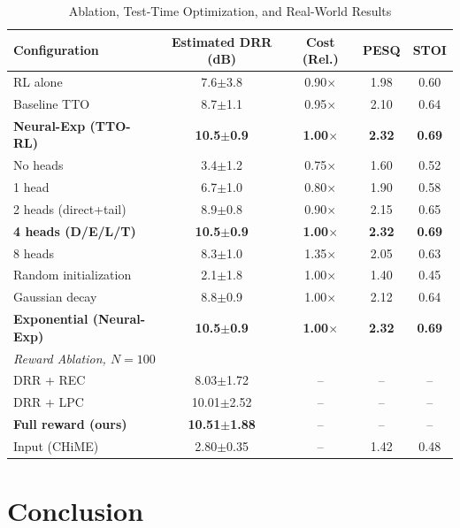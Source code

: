 \documentclass[10pt,conference]{IEEEtran}
\begin{document}
\begin{table}[H]
\centering
\caption{Ablation, Test-Time Optimization, and Real-World Results}
\label{tab:combined}
\scriptsize
\begin{tabular}{@{}lcccc@{}}
\toprule
\textbf{Configuration} & \textbf{Estimated DRR (dB)} & \textbf{Cost (Rel.)} & \textbf{PESQ} & \textbf{STOI} \\
\midrule
RL alone & 7.6$\pm$3.8 & 0.90$\times$ & 1.98 & 0.60 \\
Baseline TTO & 8.7$\pm$1.1 & 0.95$\times$ & 2.10 & 0.64 \\
\textbf{Neural-Exp (TTO-RL)} & \textbf{10.5$\pm$0.9} & \textbf{1.00$\times$} & \textbf{2.32} & \textbf{0.69} \\
\midrule
No heads & 3.4$\pm$1.2 & 0.75$\times$ & 1.60 & 0.52 \\
1 head & 6.7$\pm$1.0 & 0.80$\times$ & 1.90 & 0.58 \\
2 heads (direct+tail) & 8.9$\pm$0.8 & 0.90$\times$ & 2.15 & 0.65 \\
\textbf{4 heads (D/E/L/T)} & \textbf{10.5$\pm$0.9} & \textbf{1.00$\times$} & \textbf{2.32} & \textbf{0.69} \\
8 heads & 8.3$\pm$1.0 & 1.35$\times$ & 2.05 & 0.63 \\
\midrule
Random initialization & 2.1$\pm$1.8 & 1.00$\times$ & 1.40 & 0.45 \\
Gaussian decay & 8.8$\pm$0.9 & 1.00$\times$ & 2.12 & 0.64 \\
\textbf{Exponential (Neural-Exp)} & \textbf{10.5$\pm$0.9} & \textbf{1.00$\times$} & \textbf{2.32} & \textbf{0.69} \\
\midrule
\multicolumn{5}{l}{\textit{Reward Ablation, $N=100$}} \\
\midrule
DRR + REC & 8.03$\pm$1.72 & -- & -- & -- \\
DRR + LPC & 10.01$\pm$2.52 & -- & -- & -- \\
\textbf{Full reward (ours)} & \textbf{10.51$\pm$1.88} & -- & -- & -- \\
\midrule
Input (CHiME) & 2.80$\pm$0.35 & -- & 1.42 & 0.48 \\
\bottomrule
\end{tabular}
\end{table}

\section{Conclusion}
\end{document}

